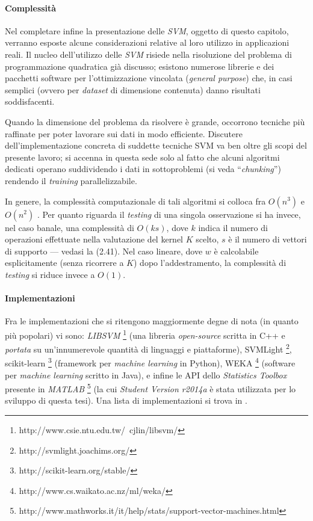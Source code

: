 \paragraph{Complessità}
Nel completare infine la presentazione delle \textit{SVM}, oggetto di questo capitolo, verranno esposte alcune considerazioni relative al loro utilizzo in applicazioni reali. Il nucleo dell'utilizzo delle \textit{SVM} risiede nella risoluzione del problema di programmazione quadratica già discusso; esistono numerose librerie e dei pacchetti software per l'ottimizzazione vincolata (\textit{general purpose}) che, in casi semplici (ovvero per \textit{dataset} di dimensione contenuta) danno risultati soddisfacenti.

Quando la dimensione del problema da risolvere è grande, occorrono tecniche più raffinate per poter lavorare sui dati in modo efficiente. Discutere dell'implementazione concreta di suddette tecniche SVM va ben oltre gli scopi del presente lavoro; si accenna in questa sede solo al fatto che alcuni algoritmi dedicati operano suddividendo i dati in sottoproblemi (si veda ``\textit{chunking}'') rendendo il \textit{training} parallelizzabile. \cite{tutorial}

In genere, la complessità computazionale di tali algoritmi si colloca fra $O(n^3)$ e $O(n^2)$ \cite{tutorial}. Per quanto riguarda il \textit{testing} di una singola osservazione si ha invece, nel caso banale, una complessità di $O(k s)$, dove $k$ indica il numero di operazioni effettuate nella valutazione del kernel $K$ scelto, $s$ è il numero di vettori di supporto --- vedasi la (2.41). Nel caso lineare, dove $w$ è calcolabile esplicitamente (senza ricorrere a $K$) dopo l'addestramento, la complessità di \textit{testing} si riduce invece a $O(1)$.

\paragraph{Implementazioni}
Fra le implementazioni che si ritengono maggiormente degne di nota (in quanto più popolari) vi sono: \textit{LIBSVM} \footnote{http://www.csie.ntu.edu.tw/~cjlin/libsvm/} (una libreria \textit{open-source} scritta in C++ e \textit{portata} su un'innumerevole quantità di linguaggi e piattaforme), SVMLight \footnote{http://svmlight.joachims.org/}, scikit-learn \footnote{http://scikit-learn.org/stable/} (framework per \textit{machine learning} in Python), WEKA \footnote{http://www.cs.waikato.ac.nz/ml/weka/} (software per \textit{machine learning} scritto in Java), e infine le API dello \textit{Statistics Toolbox} presente in \textit{MATLAB} \footnote{http://www.mathworks.it/it/help/stats/support-vector-machines.html} (la cui \textit{Student Version r2014a} è stata utilizzata per lo sviluppo di questa tesi). Una lista di implementazioni si trova in \cite{userguide}.

